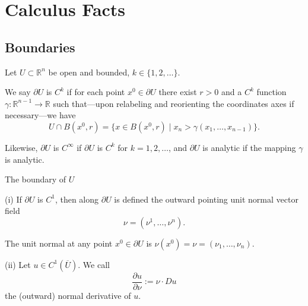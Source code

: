 
\section{Calculus Facts}
\label{sec:calculus-facts}

\subsection{Boundaries}

Let $U \subset \mathbb{R}^n$ be open and bounded, $k \in \{1,2,\ldots\}$.

\begin{definition}[$C^k$ boundary]
\label{def:ck-boundary-regularity}
We say $\partial U$ is $C^k$ if for each point $x^0 \in \partial U$ there exist $r > 0$ and a $C^k$ function $\gamma : \mathbb{R}^{n-1} \to \mathbb{R}$ such that---upon relabeling and reorienting the coordinates axes if necessary---we have
$$U \cap B(x^0, r) = \{x \in B(x^0, r) \mid x_n > \gamma(x_1, \ldots, x_{n-1})\}.$$

Likewise, $\partial U$ is $C^\infty$ if $\partial U$ is $C^k$ for $k = 1, 2, \ldots$, and $\partial U$ is analytic if the mapping $\gamma$ is analytic.
\end{definition}

\begin{figure}[h]\centering
\end{figure}

The boundary of $U$

\begin{definition}
\label{def:outward-normal-and-normal-derivative}
(i) If $\partial U$ is $C^1$, then along $\partial U$ is defined the outward pointing unit normal vector field
$$\nu = (\nu^1, \ldots, \nu^n).$$

The unit normal at any point $x^0 \in \partial U$ is $\nu(x^0) = \nu = (\nu_1, \ldots, \nu_n)$.

(ii) Let $u \in C^1(\overline{U})$. We call
$$\frac{\partial u}{\partial \nu} := \nu \cdot Du$$
the (outward) normal derivative of $u$.
\end{definition}

